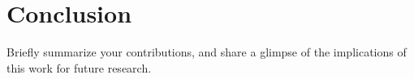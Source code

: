 \section{Conclusion}\label{s:conclusion}

Briefly summarize your contributions, and share a glimpse of the implications of
this work for future research.

\textcolor{lightgray}{\lipsum[12-13]}


